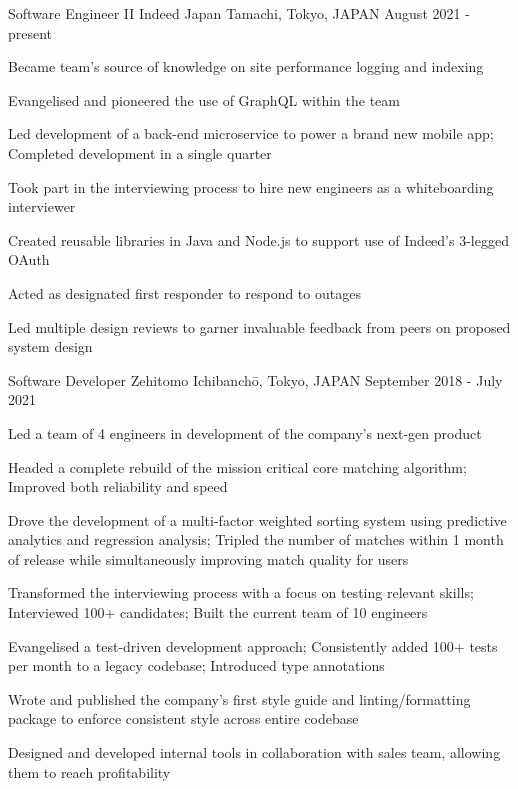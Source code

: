 
\begin{cventries}

  \cventry
  {Software Engineer II} %
  {Indeed Japan} %
  {Tamachi, Tokyo, JAPAN} %
  {August 2021 - present} %
  {
    \begin{cvitems} %
      \item {Became team's source of knowledge on site performance logging and indexing}
      \item {Evangelised and pioneered the use of GraphQL within the team}
      \item {Led development of a back-end microservice to power a brand new mobile app; Completed development in a single quarter}
      \item {Took part in the interviewing process to hire new engineers as a whiteboarding interviewer}
      \item {Created reusable libraries in Java and Node.js to support use of Indeed's 3-legged OAuth}
      \item {Acted as designated first responder to respond to outages}
      \item {Led multiple design reviews to garner invaluable feedback from peers on proposed system design}
    \end{cvitems}
  }

  \cventry
  {Software Developer} %
  {Zehitomo} %
  {Ichibanchō, Tokyo, JAPAN} %
  {September 2018 - July 2021} %
  {
    \begin{cvitems} %
      \item {Led a team of 4 engineers in development of the company's next-gen product}
      \item {Headed a complete rebuild of the mission critical core matching algorithm; Improved both reliability and speed}
      \item {Drove the development of a multi-factor weighted sorting system using predictive analytics and regression analysis; Tripled the number of matches within 1 month of release while simultaneously improving match quality for users}
      \item {Transformed the interviewing process with a focus on testing relevant skills; Interviewed 100+ candidates; Built the current team of 10 engineers}
      \item {Evangelised a test-driven development approach; Consistently added 100+ tests per month to a legacy codebase; Introduced type annotations}
      \item {Wrote and published the company's first style guide and linting/formatting package to enforce consistent style across entire codebase}
      \item {Designed and developed internal tools in collaboration with sales team, allowing them to reach profitability}
    \end{cvitems}
  }


\end{cventries}
